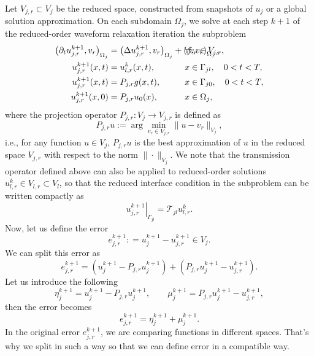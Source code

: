 \documentclass[a4paper, 11pt]{article}
\theoremstyle{plain}
\theoremstyle{definition}
\theoremstyle{remark}
\begin{document}
Let $V_{j, r}\subset V_{j}$ be the reduced space, constructed from snapshots of $u_{j}$ or a global solution approximation. On each subdomain $\Omega_{j}$, we solve at each step $k+1$ of the reduced-order waveform relaxation iteration the subproblem
\begin{align*}
    \left(\partial_{t} u_{j, r}^{k+1}, v_{r}\right)_{\Omega_{j}} &=  \left(\Delta u_{j, r}^{k+1}, v_{r}\right)_{\Omega_{j}} + \left(f, v_{r}\right)_{\Omega_{j}}, \hspace{-50pt}&& \forall v_{r}\in V_{j, r},\\
    u_{j, r}^{k+1}(x, t) &= u_{l, r}^{k}(x, t), && x\in \Gamma_{jl}, \quad 0<t<T,\\
    u_{j, r}^{k+1}(x, t) &= P_{j, r}g(x, t), && x\in \Gamma_{j0}, \quad 0<t<T,\\
    u_{j, r}^{k+1}(x, 0) &= P_{j, r}u_{0}(x), && x\in \Omega_{j},
\end{align*}
where the projection operator $P_{j, r}: V_{j} \to V_{j, r}$ is defined as
\begin{equation*}
    P_{j,r} u := \arg\min_{v_r \in V_{j,r}} \lVert u - v_r \rVert_{V_j},
\end{equation*}
i.e., for any function $u \in V_j$, $P_{j,r} u$ is the best approximation of $u$ in the reduced space $V_{j,r}$ with respect to the norm $\|\cdot\|_{V_j}$. We note that the transmission operator defined above can also be applied to reduced-order solutions $u_{l,r}^k \in V_{l,r} \subset V_l$, so that the reduced interface condition in the subproblem can be written compactly as
\begin{equation*}
    \left.u_{j,r}^{k+1}\right|_{\Gamma_{jl}} = \mathcal{T}_{jl} u_{l,r}^{k}.
\end{equation*}
Now, let us define the error
\begin{equation*}
    e_{j, r}^{k+1} : = u_{j}^{k+1} - u_{j, r}^{k+1}\in V_{j}.
\end{equation*}
We can split this error as
\begin{equation*}
    e_{j, r}^{k+1} = \left(u_{j}^{k+1} - P_{j,r}u_{j}^{k+1}\right) + \left(P_{j,r}u_{j}^{k+1} - u_{j, r}^{k+1}\right).
\end{equation*}
Let us introduce the following
\begin{equation*}
    \eta_{j}^{k+1} = u_{j}^{k+1} - P_{j,r}u_{j}^{k+1}, \qquad \mu_{j}^{k+1} = P_{j,r}u_{j}^{k+1} - u_{j, r}^{k+1},
\end{equation*}
then the error becomes
\begin{equation*}
    e_{j, r}^{k+1} = \eta_{j}^{k+1} + \mu_{j}^{k+1}.
\end{equation*}
In the original error $e_{j, r}^{k+1}$, we are comparing functions in different spaces. That's why we split in such a way so that we can define error in a compatible way. 
\end{document}
